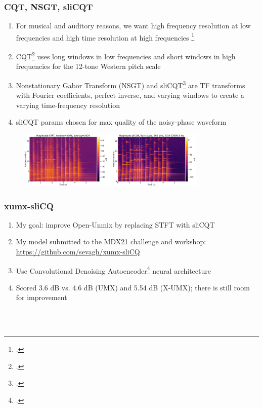 \documentclass[usenames,dvipsnames]{beamer}
\begin{document}
\begin{frame}
	\frametitle{CQT, NSGT, sliCQT}
	\begin{enumerate}
	\item
		For musical and auditory reasons, we want high frequency resolution at low frequencies and high time resolution at high frequencies \footcite{doerflerphd}
	\item
		CQT\footcite{jbrown} uses long windows in low frequencies and short windows in high frequencies for the 12-tone Western pitch scale
	\item
		Nonstationary Gabor Transform (NSGT) and sliCQT\footcite{balazs, slicq} are TF transforms with Fourier coefficients, perfect inverse, and varying windows to create a varying time-frequency resolution
	\item
		sliCQT params chosen for max quality of the noisy-phase waveform
	\end{enumerate}
	\begin{figure}[ht]
		\centering
		\vspace{-0.5em}
		\includegraphics[height=2.7cm]{./images-mml-presentation/spectrograms_comparison.png}
	\end{figure}
\end{frame}

\begin{frame}
	\frametitle{xumx-sliCQ}
	\begin{enumerate}
		\item
			My goal: improve Open-Unmix by replacing STFT with sliCQT
		\item
			My model submitted to the MDX21 challenge and workshop: \url{https://github.com/sevagh/xumx-sliCQ}
		\item
			Use Convolutional Denoising Autoencoder\footcite{plumbley1, plumbley2} neural architecture
		\item
			Scored 3.6 dB vs. 4.6 dB (UMX) and 5.54 dB (X-UMX); there is still room for improvement
	\end{enumerate}
	\begin{figure}[ht]
		\centering
		\vspace{-1.15em}
		\\
		\vspace{-0.5em}
		\\
		\vspace{-0.5em}
	\end{figure}
\end{frame}
\end{document}
